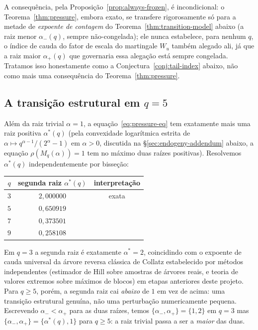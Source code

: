 \documentclass[11pt]{article}
\theoremstyle{definition}
\theoremstyle{remark}
\begin{document}
A consequência, pela Proposição~\ref{prop:always-frozen}, é
incondicional: o Teorema~\ref{thm:pressure}, embora exato, se
transfere rigorosamente só para a metade de \emph{expoente de
contagem} do Teorema~\ref{thm:transition-model} abaixo (a raiz menor
$\alpha_-(q)$, sempre não-congelada); ele nunca estabelece, para
nenhum $q$, o índice de cauda do fator de escala do martingale $W_u$
também alegado ali, já que a raiz maior $\alpha_+(q)$ que governaria
essa alegação está sempre congelada. Tratamos isso honestamente como a
Conjectura~\ref{conj:tail-index} abaixo, não como mais uma consequência
do Teorema~\ref{thm:pressure}.

\subsection{A transição estrutural em $q=5$}

Além da raiz trivial $\alpha=1$, a equação~\eqref{eq:pressure-eq} tem
exatamente mais uma raiz positiva $\alpha^\ast(q)$ (pela convexidade
logarítmica estrita de $\alpha\mapsto q^{\alpha-1}/(2^\alpha-1)$ em
$\alpha>0$, discutida na \S\ref{sec:endogeny-addendum} abaixo, a
equação $\rho(M_q(\alpha))=1$ tem no máximo duas raízes positivas).
Resolvemos $\alpha^\ast(q)$ independentemente por bisseção:

\begin{center}
\begin{tabular}{c|c|c}
$q$ & segunda raiz $\alpha^\ast(q)$ & interpretação \\ \hline
$3$ & $2{,}000000$ & exata \\
$5$ & $0{,}650919$ & \\
$7$ & $0{,}373501$ & \\
$9$ & $0{,}258108$ &
\end{tabular}
\end{center}

Em $q=3$ a segunda raiz é exatamente $\alpha^\ast=2$, coincidindo com
o expoente de cauda universal da árvore reversa clássica de Collatz
estabelecido por métodos independentes (estimador de Hill sobre
amostras de árvores reais, e teoria de valores extremos sobre máximos
de blocos) em etapas anteriores deste projeto. Para $q\ge 5$, porém, a
segunda raiz cai \emph{abaixo} de $1$ em vez de acima: uma transição
estrutural genuína, não uma perturbação numericamente pequena.
Escrevendo $\alpha_-<\alpha_+$ para as duas raízes, temos
$\{\alpha_-,\alpha_+\}=\{1,2\}$ em $q=3$ mas
$\{\alpha_-,\alpha_+\}=\{\alpha^\ast(q),1\}$ para $q\ge5$: a raiz
trivial passa a ser a \emph{maior} das duas.
\end{document}
